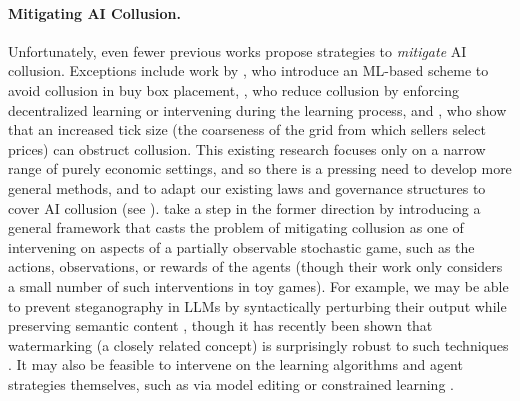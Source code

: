 \paragraph{Mitigating AI Collusion.}
Unfortunately, even fewer previous works propose strategies to \emph{mitigate} AI collusion. Exceptions include work by \citet{Brero2022}, who introduce an ML-based scheme to avoid collusion in buy box placement, \citet{Abada2023}, who reduce collusion by enforcing decentralized learning or intervening during the learning process, and \citet{cartea_algorithmic_2022}, who show that an increased tick size (the coarseness of the grid from which sellers select prices) can obstruct collusion.
This existing research focuses only on a narrow range of purely economic settings, and so there is a pressing need to develop more general methods, and to adapt our existing laws and governance structures to cover AI collusion (see ).
\citet{Foxabbott2023} take a step in the former direction by introducing a general framework that casts the problem of mitigating collusion as one of intervening on aspects of a partially observable stochastic game, such as the actions, observations, or rewards of the agents (though their work only considers a small number of such interventions in toy games). 
For example, we may be able to prevent steganography in LLMs by syntactically perturbing their output while preserving semantic content \citep{Roger2023}, though it has recently been shown that watermarking (a closely related concept) is surprisingly robust to such techniques \citep{Kirchenbauer2023}.
It may also be feasible to intervene on the learning algorithms and agent strategies themselves, such as via model editing \citep{Sinitsin2020,Mitchell2022} or constrained learning \citep{Achiam2017}.


